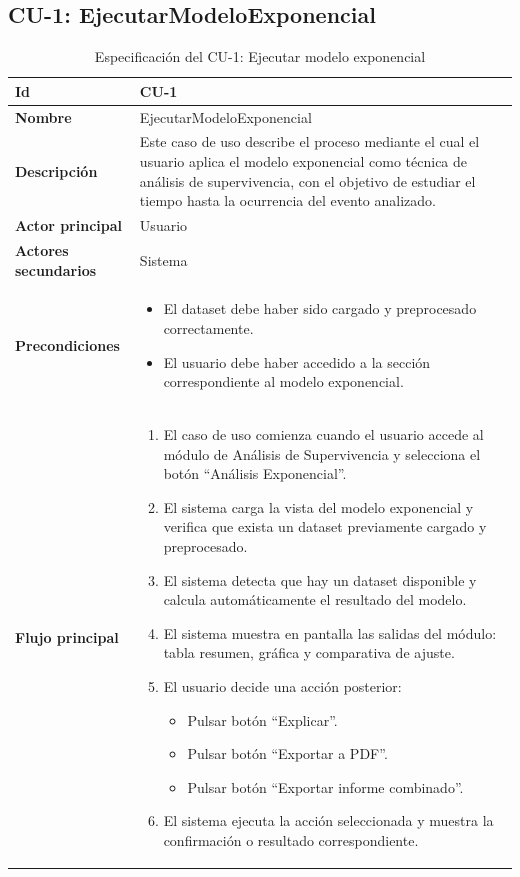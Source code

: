     \subsection{CU-1: EjecutarModeloExponencial}
    \small
\begin{longtable}{|p{4cm}|p{10cm}|}
\caption{Especificación del CU-1: Ejecutar modelo exponencial}
\label{tab:esp_cu1}\\
\hline
\textbf{Id} & CU-1 \\ \hline
\textbf{Nombre} & EjecutarModeloExponencial \\ \hline

\textbf{Descripción} & 
Este caso de uso describe el proceso mediante el cual el usuario aplica el modelo exponencial como técnica de análisis de supervivencia, con el objetivo de estudiar el tiempo hasta la ocurrencia del evento analizado. \\ \hline

\textbf{Actor principal} & Usuario \\ \hline
\textbf{Actores secundarios} & Sistema \\ \hline

\textbf{Precondiciones} & 
\begin{itemize}
    \item El dataset debe haber sido cargado y preprocesado correctamente.
    \item El usuario debe haber accedido a la sección correspondiente al modelo exponencial.
\end{itemize} \\ \hline

\textbf{Flujo principal} & 
\begin{enumerate}
    \item El caso de uso comienza cuando el usuario accede al módulo de Análisis de Supervivencia y selecciona el botón ``Análisis Exponencial''.
    \item El sistema carga la vista del modelo exponencial y verifica que exista un dataset previamente cargado y preprocesado.
    \item El sistema detecta que hay un dataset disponible y calcula automáticamente el resultado del modelo.
    \item El sistema muestra en pantalla las salidas del módulo: tabla resumen, gráfica y comparativa de ajuste.
    \item El usuario decide una acción posterior:
    \begin{itemize}
        \item Pulsar botón ``Explicar''.
        \item Pulsar botón ``Exportar a PDF''.
        \item Pulsar botón ``Exportar informe combinado''.
    \end{itemize}
    \item El sistema ejecuta la acción seleccionada y muestra la confirmación o resultado correspondiente.
\end{enumerate} \\ \hline


\end{longtable}
